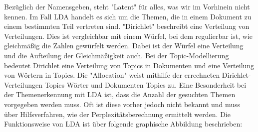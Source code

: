\documentclass[german,version-2020-11]{uzl-thesis}
\begin{document}
Bezüglich der Namensgeben, steht "Latent" für alles, was wir im Vorhinein nicht kennen. Im Fall LDA handelt es sich um die Themen, die in einem Dokument zu einem bestimmten Teil vertreten sind. "Dirichlet" beschreibt eine Verteilung von Verteilungen. Dies ist vergleichbar mit einem Würfel, bei dem regulierbar ist, wie gleichmäßig die Zahlen gewürfelt werden. Dabei ist der Würfel eine Verteilung und die Aufteilung der Gleichmäßigkeit auch. Bei der Topic-Modellierung bedeutet Dirichlet eine Verteilung von Topics in Dokumenten und eine Verteilung von Wörtern in Topics. Die "Allocation" weist  mithilfe der errechneten Dirichlet-Verteilungen Topics Wörter und Dokumenten Topics zu. Eine Besonderheit bei der Themenerkennung mit LDA ist, dass die Anzahl der gesuchten Themen  vorgegeben werden muss. Oft ist diese vorher jedoch nicht bekannt und muss über Hilfsverfahren, wie der Perplexitätsberechnung ermittelt werden. Die Funktionsweise von LDA ist über folgende graphische Abbildung beschrieben: \\

\begin{center}
\end{center}\\
\end{document}
